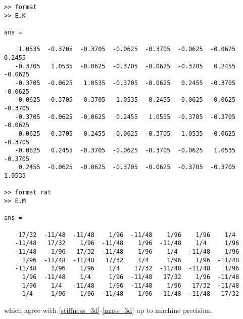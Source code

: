 \documentclass[a4paper]{article}
\begin{document}
\begin{lstlisting}
>> format
>> E.K

ans =

    1.0535  -0.3705  -0.3705  -0.0625  -0.3705  -0.0625  -0.0625   0.2455
   -0.3705   1.0535  -0.0625  -0.3705  -0.0625  -0.3705   0.2455  -0.0625
   -0.3705  -0.0625   1.0535  -0.3705  -0.0625   0.2455  -0.3705  -0.0625
   -0.0625  -0.3705  -0.3705   1.0535   0.2455  -0.0625  -0.0625  -0.3705
   -0.3705  -0.0625  -0.0625   0.2455   1.0535  -0.3705  -0.3705  -0.0625
   -0.0625  -0.3705   0.2455  -0.0625  -0.3705   1.0535  -0.0625  -0.3705
   -0.0625   0.2455  -0.3705  -0.0625  -0.3705  -0.0625   1.0535  -0.3705
    0.2455  -0.0625  -0.0625  -0.3705  -0.0625  -0.3705  -0.3705   1.0535
      
>> format rat
>> E.M

ans =

    17/32  -11/48  -11/48    1/96  -11/48    1/96    1/96    1/4
   -11/48   17/32    1/96  -11/48    1/96  -11/48    1/4     1/96
   -11/48    1/96   17/32  -11/48    1/96    1/4   -11/48    1/96    
     1/96  -11/48  -11/48   17/32    1/4     1/96    1/96  -11/48    
   -11/48    1/96    1/96    1/4    17/32  -11/48  -11/48    1/96    
     1/96  -11/48    1/4     1/96  -11/48   17/32    1/96  -11/48    
     1/96    1/4   -11/48    1/96  -11/48    1/96   17/32  -11/48    
     1/4     1/96    1/96  -11/48    1/96  -11/48  -11/48   17/32  
\end{lstlisting}

\noindent
which agree with \eqref{stiffness_3d}-\eqref{mass_3d} up to machine precision.




\end{document}
